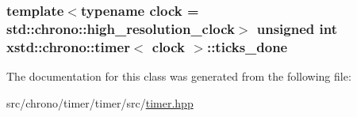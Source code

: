 \hypertarget{classxstd_1_1chrono_1_1timer_a40ec5c890d4e54669729744b634daa9e}{
\subsubsection[{ticks\-\_\-done}]{\setlength{\rightskip}{0pt plus 5cm}template$<$typename clock  = std\-::chrono\-::high\-\_\-resolution\-\_\-clock$>$ unsigned int {\bf xstd\-::chrono\-::timer}$<$ clock $>$\-::ticks\-\_\-done\hspace{0.3cm}{\ttfamily [protected]}}}\label{classxstd_1_1chrono_1_1timer_a40ec5c890d4e54669729744b634daa9e}


The documentation for this class was generated from the following file\-:\begin{DoxyCompactItemize}
\item 
src/chrono/timer/timer/src/\hyperlink{timer_8hpp}{timer.\-hpp}\end{DoxyCompactItemize}
